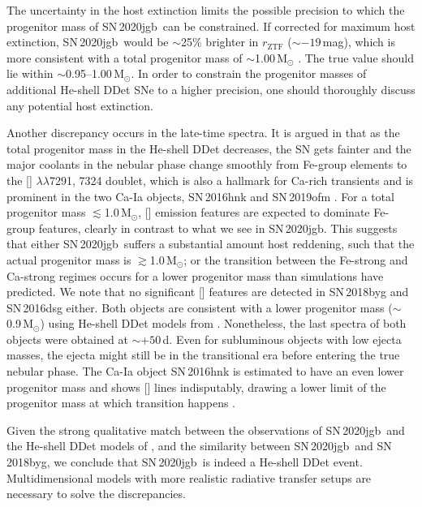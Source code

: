 \documentclass[twocolumn]{aastex631}
\newcommand{\sn}{SN\,2020jgb}
\begin{document}
The uncertainty in the host extinction limits the possible precision to which the progenitor mass of \sn\ can be constrained. If corrected for maximum host extinction, \sn\ would be $\sim$25\% brighter in $r_\mathrm{ZTF}$ ($\sim$$-19$\,mag), which is more consistent with a total progenitor mass of $\sim$1.00\,$\mathrm{M_\odot}$ \citep{polin_observational_2019}. The true value should lie within $\sim$0.95--1.00\,$\mathrm{M_\odot}$. In order to constrain the progenitor masses of additional He-shell DDet SNe to a higher precision, one should thoroughly discuss any potential host extinction.

Another discrepancy occurs in the late-time spectra. It is argued in \citet{polin_nebular_2021} that as the total progenitor mass in the He-shell DDet decreases, the SN gets fainter and the major coolants in the nebular phase change smoothly from Fe-group elements to the [] $\lambda\lambda$7291, 7324 doublet, which is also a hallmark for Ca-rich transients and is prominent in the two Ca-Ia objects, SN\,2016hnk and SN\,2019ofm \citep{galbany_16hnk_2019,De_Ca-rich_2020}. For a total progenitor mass $\lesssim$1.0\,$\mathrm{M_\odot}$, [] emission features are expected to dominate Fe-group features, clearly in contrast to what we see in \sn. This suggests that either \sn\ suffers a substantial amount host reddening, such that the actual progenitor mass is $\gtrsim$1.0\,$\mathrm{M_\odot}$; or the transition between the Fe-strong and Ca-strong regimes occurs for a lower progenitor mass than simulations have predicted. We note that no significant [] features are detected in SN\,2018byg and SN\,2016dsg either. Both objects are consistent with a lower progenitor mass ($\sim$0.9\,$\mathrm{M_\odot}$) using He-shell DDet models from \citet{polin_observational_2019}. Nonetheless, the last spectra of both objects were obtained at $\sim$$+50$\,d. Even for subluminous objects with low ejecta masses, the ejecta might still be in the transitional era before entering the true nebular phase. The Ca-Ia object SN\,2016hnk is estimated to have an even lower progenitor mass \citep[$\sim$0.87\,$\mathrm{M_\odot}$;][]{jacobson-galan_16hnk_2020} and shows [] lines indisputably, drawing a lower limit of the progenitor mass at which transition happens \citep[c.f.,][for discussion on the potential host galaxy extinction on SN\,2016hnk]{galbany_16hnk_2019}.

Given the strong qualitative match between the observations of \sn\ and the He-shell DDet models of \citet{polin_observational_2019}, and the similarity between \sn\ and SN\,2018byg, we conclude that \sn\ is indeed a He-shell DDet event. Multidimensional models with more realistic radiative transfer setups are necessary to solve the discrepancies.
\end{document}
